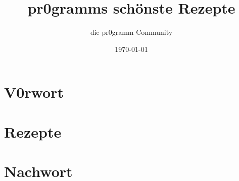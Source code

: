 \documentclass[oneside]{book}
\author{die pr0gramm Community}
\title{pr0gramms schönste Rezepte}
\date{\today}
\begin{document}
	

	\pagecolor{white}

	\setcounter{secnumdepth}{1}
	\setcounter{tocdepth}{1}

	\tableofcontents

	\chapter{V0rwort}
	
	

	\chapter{Rezepte}
	
	
	
	
	
	
	
	
	
	
	
	
	
	

	\chapter{Nachwort}
	
\end{document}
